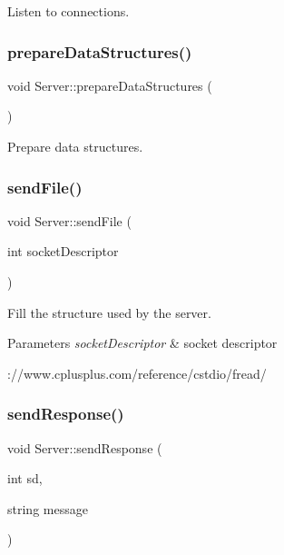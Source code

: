 Listen to connections. \mbox{\label{classServer_a5a4cae5c2975f4f9a655b766f10628dd}} 
\subsubsection{\texorpdfstring{prepare\+Data\+Structures()}{prepareDataStructures()}}
{\footnotesize\ttfamily void Server\+::prepare\+Data\+Structures (\begin{DoxyParamCaption}{ }\end{DoxyParamCaption})\hspace{0.3cm}{\ttfamily [private]}}

Prepare data structures. \mbox{\label{classServer_af8e4dc8d1a4eff9b99165513e5123d8a}} 
\subsubsection{\texorpdfstring{send\+File()}{sendFile()}}
{\footnotesize\ttfamily void Server\+::send\+File (\begin{DoxyParamCaption}\item[{int}]{socket\+Descriptor }\end{DoxyParamCaption})\hspace{0.3cm}{\ttfamily [private]}}

Fill the structure used by the server. 
\begin{DoxyParams}{Parameters}
{\em socket\+Descriptor} & socket descriptor\\
\hline
\end{DoxyParams}
\+://www.cplusplus.\+com/reference/cstdio/fread/ \mbox{\label{classServer_a925825ad85f2ee6695d46d479e1a9511}} 
\subsubsection{\texorpdfstring{send\+Response()}{sendResponse()}}
{\footnotesize\ttfamily void Server\+::send\+Response (\begin{DoxyParamCaption}\item[{int}]{sd,  }\item[{string}]{message }\end{DoxyParamCaption})\hspace{0.3cm}{\ttfamily [private]}}

